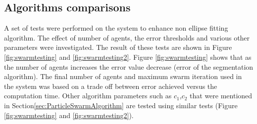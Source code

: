 \documentclass[preprint,10pt,5p,twocolumn]{elsarticle}
\begin{document}
\begin{table}
\begin{center}
\caption[Datasets Comparisons]{Datasets Comparisons} 
\label{tab:datasets}

\end{center}
\end{table}

 


\subsection{Algorithms comparisons}
\label{sec:AlgExp}
A set of tests were performed on the system to enhance non ellipse fitting algorithm. The effect of number of agents, the error thresholds and various other parameters were investigated. The result of these tests are shown in Figure \ref{fig:swarmtesting} and   \ref{fig:swarmtesting2}. Figure \ref{fig:swarmtesting} shows that as the number of agents increases the error value decrease (error of the segmentation algorithm). The final number of agents and maximum swarm iteration used in the system was based on a trade off between error achieved versus the computation time. Other algorithm parameters such as $c_1$,$c_2$ that were mentioned in Section\ref{sec:ParticleSwarmAlgorithm} are tested using similar tests (Figure \ref{fig:swarmtesting} and \ref{fig:swarmtesting2}).
    
\end{document}
